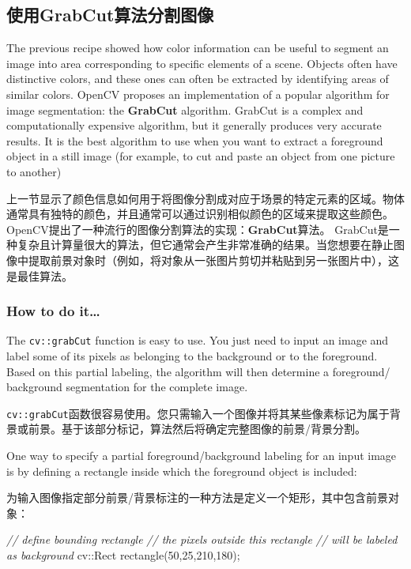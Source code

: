 \documentclass[]{article}
\newenvironment{Shaded}{}{}
\newcommand{\CommentTok}[1]{\textcolor[rgb]{0.38,0.63,0.69}{\textit{#1}}}
\newcommand{\DecValTok}[1]{\textcolor[rgb]{0.25,0.63,0.44}{#1}}
\newcommand{\NormalTok}[1]{#1}
\begin{document}
\hypertarget{header-n1277}{%
\subsection{使用GrabCut算法分割图像}\label{header-n1277}}

The previous recipe showed how color information can be useful to
segment an image into area corresponding to specific elements of a
scene. Objects often have distinctive colors, and these ones can often
be extracted by identifying areas of similar colors. OpenCV proposes an
implementation of a popular algorithm for image segmentation: the
\textbf{GrabCut} algorithm. GrabCut is a complex and computationally
expensive algorithm, but it generally produces very accurate results. It
is the best algorithm to use when you want to extract a foreground
object in a still image (for example, to cut and paste an object from
one picture to another)

上一节显示了颜色信息如何用于将图像分割成对应于场景的特定元素的区域。物体通常具有独特的颜色，并且通常可以通过识别相似颜色的区域来提取这些颜色。
OpenCV提出了一种流行的图像分割算法的实现：\textbf{GrabCut}算法。
GrabCut是一种复杂且计算量很大的算法，但它通常会产生非常准确的结果。当您想要在静止图像中提取前景对象时（例如，将对象从一张图片剪切并粘贴到另一张图片中），这是最佳算法。

\hypertarget{header-n1280}{%
\subsubsection{How to do it\ldots{}}\label{header-n1280}}

The \texttt{cv::grabCut} function is easy to use. You just need to input
an image and label some of its pixels as belonging to the background or
to the foreground. Based on this partial labeling, the algorithm will
then determine a foreground/ background segmentation for the complete
image.

\texttt{cv::grabCut}函数很容易使用。您只需输入一个图像并将其某些像素标记为属于背景或前景。基于该部分标记，算法然后将确定完整图像的前景/背景分割。

One way to specify a partial foreground/background labeling for an input
image is by defining a rectangle inside which the foreground object is
included:

为输入图像指定部分前景/背景标注的一种方法是定义一个矩形，其中包含前景对象：

\begin{Shaded}
\begin{Highlighting}[]
\CommentTok{// define bounding rectangle}
\CommentTok{// the pixels outside this rectangle}
\CommentTok{// will be labeled as background}
\NormalTok{cv::Rect rectangle(}\DecValTok{50}\NormalTok{,}\DecValTok{25}\NormalTok{,}\DecValTok{210}\NormalTok{,}\DecValTok{180}\NormalTok{);}
\end{Highlighting}
\end{Shaded}
\end{document}

